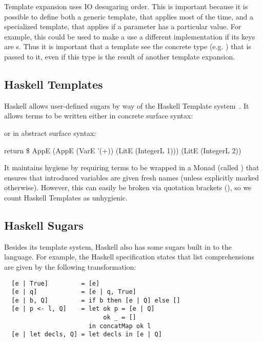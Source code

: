 Template expansion uses IO desugaring order. This is important because
it is possible
to define both a generic template, that applies most of the time, and
a specialized template, that applies if a parameter has a particular
value. For example, this could be used to make a  use a different
implementation if its keys are s. Thus it is important that
a template see the concrete type (e.g. ) that is passed to
it, even if this type is the result of another template expansion.

\subsection{Haskell Templates} \label{sec:taxonomy-haskell}

Haskell allows user-defined sugars by way of the Haskell Template
system~\cite{haskell-templates}. It allows terms to be written either in concrete surface
syntax:
\begin{Codes}
  [| 1 + 2 |]
\end{Codes}
or in abstract surface syntax:
\begin{Codes}
  return \$ AppE (AppE (VarE '(+)) (LitE (IntegerL 1))) (LitE (IntegerL 2))
\end{Codes}

It maintains hygiene by requiring terms to be wrapped in a Monad
(called ) that ensures that introduced variables are given
fresh names (unless explicitly marked otherwise). However, this can
easily be broken via quotation brackets (\Code{[| ... |]}), so we
count Haskell Templates as unhygienic.


\subsection{Haskell Sugars}

Besides its template system, Haskell also has some sugars built in to
the language. For example, the Haskell specification states that list
comprehensions~\cite[section 3.11]{haskell-language} are
given by the following transformation:
\begin{verbatim}
  [e | True]         = [e]
  [e | q]            = [e | q, True]
  [e | b, Q]         = if b then [e | Q] else []
  [e | p <- l, Q]    = let ok p = [e | Q]
                           ok _ = []
                       in concatMap ok l
  [e | let decls, Q] = let decls in [e | Q]
\end{verbatim}

